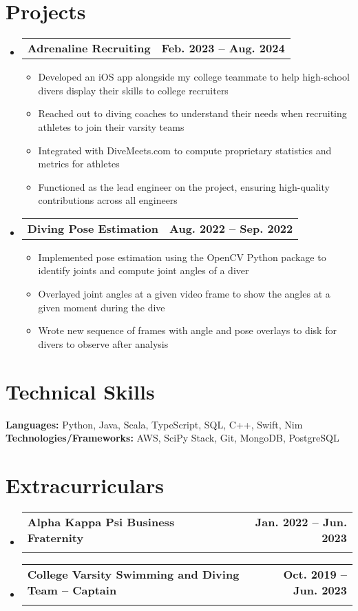\documentclass[letterpaper,11pt]{article}
\makeatletter
\newcommand{\resumeItem}[1]{
  \item\small{
    {#1 \vspace{-2pt}}
  }
}
\newcommand{\resumeSubheading}[4]{
  \vspace{-2pt}\item
    \begin{tabular*}{1.0\textwidth}[t]{l@{\extracolsep{\fill}}r}
      \textbf{#1} & \textbf{\small #2} \\
      \textit{\small#3} & \textit{\small #4} \\
    \end{tabular*}\vspace{-7pt}
}
\newcommand{\resumeProjectHeading}[2]{
    \item
    \begin{tabular*}{1.001\textwidth}{l@{\extracolsep{\fill}}r}
      \small#1 & \textbf{\small #2}\\
    \end{tabular*}\vspace{-7pt}
}
\newcommand{\resumeSubHeadingListStart}{\begin{itemize}[leftmargin=0.0in, label={}]}
\newcommand{\resumeSubHeadingListEnd}{\end{itemize}}
\newcommand{\resumeItemListStart}{\begin{itemize}}
\newcommand{\resumeItemListEnd}{\end{itemize}\vspace{0pt}}
\makeatother
\begin{document}
\section{Projects}
    \vspace{-5pt}
    \resumeSubHeadingListStart
    \resumeProjectHeading
      {\textbf{Adrenaline Recruiting}{}}{Feb. 2023 -- Aug. 2024}
      \resumeItemListStart
        \resumeItem{Developed an iOS app alongside my college teammate to help high-school divers display their skills to college recruiters}
        \resumeItem{Reached out to diving coaches to understand their needs when recruiting athletes to join their varsity teams}
        \resumeItem{Integrated with DiveMeets.com to compute proprietary statistics and metrics for athletes}
        \resumeItem{Functioned as the lead engineer on the project, ensuring high-quality contributions across all engineers}
      \resumeItemListEnd
      \vspace{-13pt}
      \resumeProjectHeading
          {\textbf{Diving Pose Estimation}{}}{Aug. 2022 -- Sep. 2022}
          \resumeItemListStart
            \resumeItem{Implemented pose estimation using the OpenCV Python package to identify joints and compute joint angles of a diver}
            \resumeItem{Overlayed joint angles at a given video frame to show the angles at a given moment during the dive}
            \resumeItem{Wrote new sequence of frames with angle and pose overlays to disk for divers to observe after analysis}
          \resumeItemListEnd
    \resumeSubHeadingListEnd
\vspace{-15pt}


%
\section{Technical Skills}
 \begin{itemize}[leftmargin=0.15in, label={}]
    \small{\item{
     \textbf{Languages: }{Python, Java, Scala, TypeScript, SQL, C++, Swift, Nim} \\
     \textbf{Technologies/Frameworks: }{AWS, SciPy Stack, Git, MongoDB, PostgreSQL} \\
    }}
 \end{itemize}
 \vspace{-16pt}


\section{Extracurriculars}
    \resumeSubHeadingListStart
        \resumeSubheading{Alpha Kappa Psi Business Fraternity}{Jan. 2022 -- Jun. 2023}{}{} \vspace{-13.5pt}
        \resumeSubheading{College Varsity Swimming and Diving Team -- Captain}{Oct. 2019 -- Jun. 2023}{}{}
    \resumeSubHeadingListEnd
\end{document}
